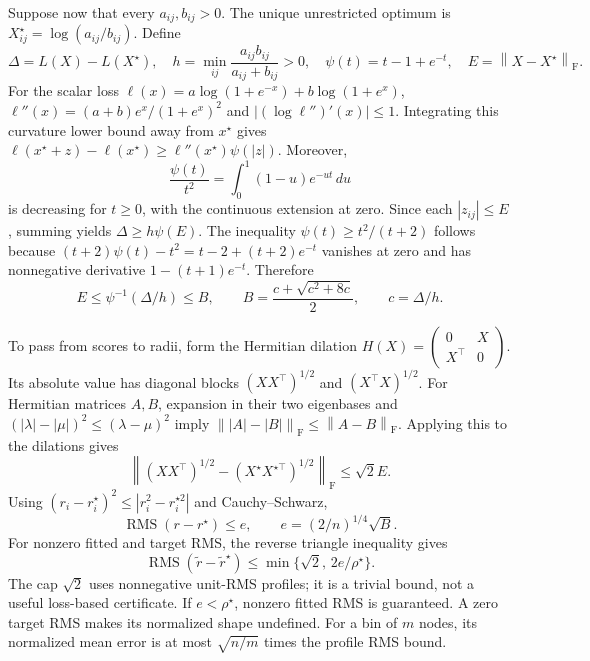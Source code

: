 \documentclass[aps,pre,onecolumn,10pt,superscriptaddress]{revtex4-2}
\newcommand{\norm}[1]{\left\lVert #1\right\rVert}
\newcommand{\RMS}{\operatorname{RMS}}
\begin{document}
Suppose now that every \(a_{ij},b_{ij}>0\).
The unique unrestricted optimum is \(X^\star_{ij}=\log(a_{ij}/b_{ij})\).
Define
\begin{equation}
 \Delta=L(X)-L(X^\star),\quad
 h=\min_{ij}\frac{a_{ij}b_{ij}}{a_{ij}+b_{ij}}>0,\quad
 \psi(t)=t-1+e^{-t},\quad E=\norm{X-X^\star}_{\mathrm F}.
\end{equation}
For the scalar loss \(\ell(x)=a\log(1+e^{-x})+b\log(1+e^x)\),
\(\ell''(x)=(a+b)e^x/(1+e^x)^2\) and \(\lvert(\log\ell'')'(x)\rvert\le1\).
Integrating this curvature lower bound away from \(x^\star\) gives
\(\ell(x^\star+z)-\ell(x^\star)\ge\ell''(x^\star)\psi(|z|)\).
Moreover,
\begin{equation}
 \frac{\psi(t)}{t^2}=\int_0^1(1-u)e^{-ut}\,du
\end{equation}
is decreasing for \(t\ge0\), with the continuous extension at zero.
Since each \(|z_{ij}|\le E\), summing yields \(\Delta\ge h\psi(E)\).
The inequality \(\psi(t)\ge t^2/(t+2)\) follows because
\((t+2)\psi(t)-t^2=t-2+(t+2)e^{-t}\) vanishes at zero and has nonnegative derivative \(1-(t+1)e^{-t}\).
Therefore
\begin{equation}
 E\le\psi^{-1}(\Delta/h)\le B,
 \qquad B=\frac{c+\sqrt{c^2+8c}}2,\qquad c=\Delta/h.
 \label{eq:score-bound}
\end{equation}

To pass from scores to radii, form the Hermitian dilation
\(H(X)=\left(\begin{smallmatrix}0&X\\X^\top&0\end{smallmatrix}\right)\).
Its absolute value has diagonal blocks \((XX^\top)^{1/2}\) and \((X^\top X)^{1/2}\).
For Hermitian matrices \(A,B\), expansion in their two eigenbases and
\((|\lambda|-|\mu|)^2\le(\lambda-\mu)^2\) imply
\(\norm{|A|-|B|}_{\mathrm F}\le\norm{A-B}_{\mathrm F}\).
Applying this to the dilations gives
\begin{equation}
 \norm{(XX^\top)^{1/2}-(X^\star X^{\star\top})^{1/2}}_{\mathrm F}
 \le\sqrt2 E.
\end{equation}
Using \((r_i-r_i^\star)^2\le|r_i^2-r_i^{\star2}|\) and Cauchy--Schwarz,
\begin{equation}
 \RMS(r-r^\star)\le e,\qquad e=(2/n)^{1/4}\sqrt B.
\end{equation}
For nonzero fitted and target RMS, the reverse triangle inequality gives
\begin{equation}
 \RMS(\widetilde r-\widetilde r^\star)
 \le\min\{\sqrt2,\,2e/\rho^\star\}.
\end{equation}
The cap \(\sqrt2\) uses nonnegative unit-RMS profiles; it is a trivial bound, not a useful loss-based certificate.
If \(e<\rho^\star\), nonzero fitted RMS is guaranteed.
A zero target RMS makes its normalized shape undefined.
For a bin of \(m\) nodes, its normalized mean error is at most \(\sqrt{n/m}\) times the profile RMS bound.
\end{document}
